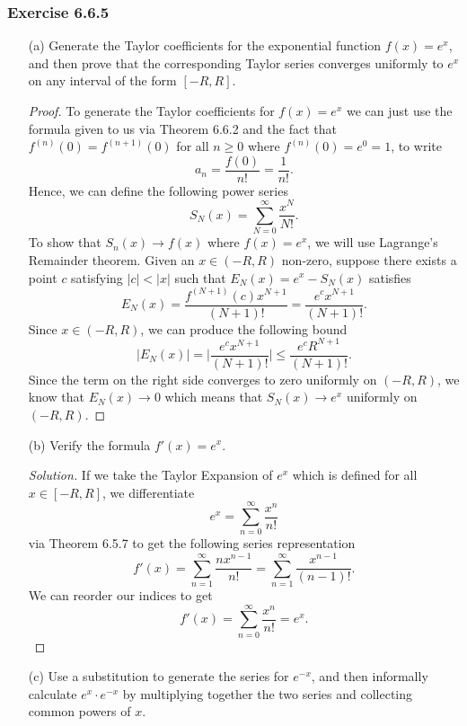 \subsubsection{Exercise 6.6.5} 
\begin{enumerate}
    \item[(a)] Generate the Taylor coefficients for the exponential function \( f(x) = e^{x} \), and then prove that the corresponding Taylor series converges uniformly to \( e^{x} \) on any interval of the form \( [-R,R] \).
        \begin{proof}
        To generate the Taylor coefficients for \( f(x) = e^{x} \) we can just use the formula given to us via Theorem 6.6.2 and the fact that \( f^{(n)}(0) = f^{(n+1)}(0) \) for all \( n \geq 0  \) where \( f^{(n)}(0) = e^{0}= 1  \), to write 
        \[  a_n = \frac{ f(0)  }{ n! } = \frac{ 1 }{ n! }. \]
        Hence, we can define the following power series 
        \[  S_N(x) = \sum_{ N=0  }^{ \infty  } \frac{ x^N  }{ N! }. \]
        To show that \( S_n(x) \to f(x)  \) where \( f(x) = e^{x} \), we will use Lagrange's Remainder theorem. Given an \(  x \in (-R ,R ) \) non-zero, suppose there exists a point \( c  \) satisfying \( | c  | < | x  |  \) such that \( E_N(x) = e^{x} - S_{N}(x)   \) satisfies  
        \[  E_{N}(x) =  \frac{ f^{(N+1)}(c) x^{N+1} }{ (N+1)! }  =  \frac{ e^c x^{N+1} }{ (N+1)! } .   \]
        Since \( x \in (-R ,R ) \), we can produce the following bound 
        \[  | E_N(x)  | = \Big| \frac{ e^c x^{N+1}  }{ (N+1)!  }  \Big| \leq \frac{ e^{c} R^{N+1} }{ (N+1)! }.   \]
        Since the term on the right side converges to zero uniformly on \( (-R ,R ) \), we know that \( E_N(x) \to 0  \) which means that \(  S_N(x) \to e^{x} \) uniformly on \( (-R ,R ) \).
        \end{proof}
    \item[(b)] Verify the formula \( f'(x) = e^{x} \).
        \begin{proof}[Solution]
            If we take the Taylor Expansion of \( e^{x} \) which is defined for all \( x \in [-R ,R ] \), we differentiate 
            \[  e^{x} = \sum_{ n=0  }^{ \infty  } \frac{ x^{n} }{ n! }  \] via Theorem 6.5.7 to get the following series representation 
            \[  f'(x) = \sum_{ n=1 }^{ \infty  } \frac{ n x^{n-1} }{ n! } =   \sum_{ n=1 }^{ \infty  } \frac{ x^{n-1} }{ (n-1)! }. \]
            We can reorder our indices to get 
            \[  f'(x) = \sum_{ n=0  }^{ \infty  } \frac{ x^{n} }{ n! } = e^{x}. \]
        \end{proof}
    \item[(c)] Use a substitution to generate the series for \( e^{-x} \), and then informally calculate \( e^{x} \cdot e^{-x} \) by multiplying together the two series and collecting common powers of \( x \).

\end{enumerate}
